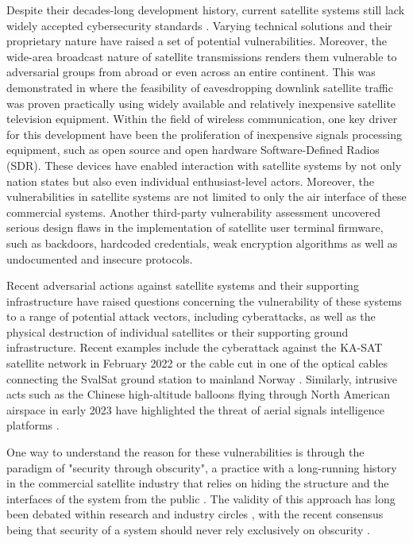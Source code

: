 \documentclass[english, 12pt, a4paper, elec, utf8, a-1b, online]{aaltothesis}
\begin{document}
Despite their decades-long development history, current satellite systems still lack widely accepted cybersecurity standards \cite{lin2022defending}.
Varying technical solutions and their proprietary nature have raised a set of potential vulnerabilities.
Moreover, the wide-area broadcast nature of satellite transmissions renders them vulnerable to adversarial groups from abroad or even across an entire continent.
This was demonstrated in \cite{pavur2020tale} where the feasibility of eavesdropping downlink satellite traffic was proven practically using widely available and relatively inexpensive satellite television equipment.
Within the field of wireless communication, one key driver for this development have been the proliferation of inexpensive signals processing equipment, such as open source and open hardware Software-Defined Radios (SDR).
These devices have enabled interaction with satellite systems by not only nation states but also even individual enthusiast-level actors.
Moreover, the vulnerabilities in satellite systems are not limited to only the air interface of these commercial systems.
Another third-party vulnerability assessment \cite{santamarta2014wake} uncovered serious design flaws in the implementation of satellite user terminal firmware, such as backdoors, hardcoded credentials, weak encryption algorithms as well as undocumented and insecure protocols.

Recent adversarial actions against satellite systems and their supporting infrastructure have raised questions concerning the vulnerability of these systems to a range of potential attack vectors, including cyberattacks, as well as the physical destruction of individual satellites or their supporting ground infrastructure.
Recent examples include the cyberattack against the KA-SAT satellite network in February 2022 \cite{boschetti2022space} or the cable cut in one of the optical cables connecting the SvalSat ground station to mainland Norway \cite{schia2023subsea}.
Similarly, intrusive acts such as the Chinese high-altitude balloons flying through North American airspace in early 2023 have highlighted the threat of aerial signals intelligence platforms \cite{ap-news-2023-02-balloon-signals}.

One way to understand the reason for these vulnerabilities is through the paradigm of "security through obscurity", a practice with a long-running history in the commercial satellite industry that relies on hiding the structure and the interfaces of the system from the public \cite{lin2022defending}.
The validity of this approach has long been debated within research and industry circles \cite{johansson2008great}, with the recent consensus being that security of a system should never rely exclusively on obscurity \cite{diehl2016law, guo2018defending}.
\end{document}
